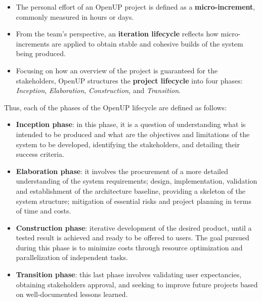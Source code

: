 \begin{itemize}
\item The personal effort of an OpenUP project is defined as a \textbf{micro-increment}, commonly measured in hours or days.

\item From the team’s perspective, an \textbf{iteration lifecycle} reflects how micro-increments are applied to obtain stable and cohesive builds of the system being produced.

\item Focusing on how an overview of the project is guaranteed for the stakeholders, OpenUP structures the \textbf{project lifecycle} into four phases: \emph{Inception}, \emph{Elaboration}, \emph{Construction}, and \emph{Transition}.
\end{itemize}


Thus, each of the phases of the OpenUP lifecycle are defined as follows:

\begin{itemize}

\item \textbf{Inception phase}: in this phase, it is a question of understanding what is intended to be produced and what are the objectives and limitations of the system to be developed, identifying the stakeholders, and detailing their success criteria.

\item \textbf{Elaboration phase}: it involves the procurement of a more detailed understanding of the system requirements; design, implementation, validation and establishment of the architecture baseline, providing a skeleton of the system structure; mitigation of essential risks and project planning in terms of time and costs.

\item \textbf{Construction phase}: iterative development of the desired product, until a tested result is achieved and ready to be offered to users. The goal pursued during this phase is to minimize costs through resource optimization and parallelization of independent tasks.

\item \textbf{Transition phase}: this last phase involves validating user expectancies, obtaining stakeholders approval, and seeking to improve future projects based on well-documented lessons learned.

\end{itemize}

